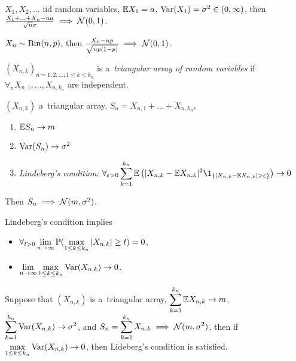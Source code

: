 



	\begin{theorem}
		$X_1, X_2, \ldots$ iid random variables, $\E X_1 = a$, $\var(X_1) = \sigma^2 \in (0,\infty)$, then $\frac{X_1 + \ldots + X_n - na}{\sqrt{n}\sigma} \implies \N(0,1)$.
	\end{theorem}
	
	\begin{corollary}
		$X_n \sim \mr{Bin}(n,p)$, then $\frac{X_n - np}{\sqrt{np(1-p)}} \implies \N(0,1)$.
	\end{corollary}
	
	\begin{definition}
		$(X_{n,k})_{n=1,2,\ldots; 1 \leq k \leq k_n}$ is a~\emph{triangular array of random variables} if $\forall_n X_{n,1}, \ldots, X_{n,k_n}$ are independent.
	\end{definition}
	
	\begin{theorem}
		$(X_{n,k})$ a~triangular array, $S_n = X_{n,1} + \ldots + X_{n,k_n}$,
		\begin{enumerate}
			\item $\E S_n \to m$
			\item $\var(S_n) \to \sigma^2$
			\item \emph{Lindeberg's condition:} $\displaystyle \forall_{\varepsilon>0} \sum_{k=1}^{k_n} \E \left( |X_{n,k} - \E X_{n,k}|^2 \1_{\{|X_{n,k} - \E X_{n,k} | > \varepsilon \}} \right) \to 0$
		\end{enumerate}
		Then $S_n \implies \N(m,\sigma^2)$.

	\end{theorem}
	
	\begin{lemma}
		Lindeberg's condition implies
		\begin{itemize}
			\item $\displaystyle \forall_{t>0} \lim_{n \to \infty} \P(\max_{1 \leq k \leq k_n} |X_{n,k}| \geq t) = 0$,
			\item $\displaystyle \lim_{n\to \infty} \max_{1 \leq k \leq k_n} \var(X_{n,k}) \to 0$.
		\end{itemize}

	\end{lemma}
	
	\begin{theorem}[Feller]
		Suppose that $(X_{n,k})$ is a~triangular array, $\displaystyle \sum_{k=1}^{k_n} \E X_{n,k} \to m$, \\ $\displaystyle \sum_{k=1}^{k_n} \var(X_{n,k}) \to \sigma^2$, and $\displaystyle S_n= \sum_{k=1}^{k_n} X_{n,k} \implies \N(m,\sigma^2)$, then if $\displaystyle \max_{1 \leq k \leq k_n} \var(X_{n,k}) \to 0$, then Lideberg's condition is satisfied.
	\end{theorem}






 
 
